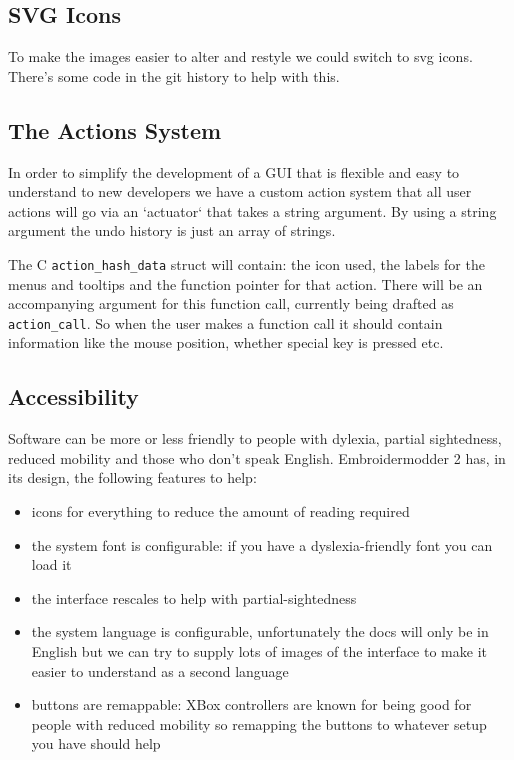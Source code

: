 \documentclass[11pt]{report}
\begin{document}
\subsection{SVG Icons}

To make the images easier to alter and restyle we could
switch to svg icons. There's some code in the git history
to help with this.

\subsection{The Actions System}

In order to simplify the development of a GUI that is flexible and
easy to understand to new developers we have a custom action system that all
user actions will go via an `actuator` that takes a string argument. By using a
string argument the undo history is just an array of strings.

The C \texttt{action\_hash\_data} struct will contain: the icon used, the labels for the
menus and tooltips and the function pointer for that action.
There will be an accompanying argument for this function call, currently being
drafted as \texttt{action\_call}. So when the user makes a function call it should
contain information like the mouse position, whether special key is pressed
etc.

\subsection{Accessibility}

Software can be more or less friendly to people with dylexia, partial sightedness,
reduced mobility and those who don't speak English.
Embroidermodder 2 has, in its design, the following features to help:

\begin{itemize}
\item icons for everything to reduce the amount of reading required
\item the system font is configurable: if you have a dyslexia-friendly font you can load it
\item the interface rescales to help with partial-sightedness
\item the system language is configurable, unfortunately the docs will only be in English but we can try to supply lots of images of the interface to make it easier to understand as a second language
\item buttons are remappable: XBox controllers are known for being good for people with reduced mobility so remapping the buttons to whatever setup you have should help
\end{itemize}
\end{document}
